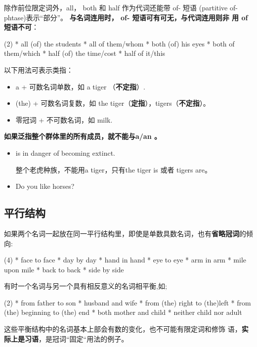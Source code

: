 除作前位限定词外，all， both 和 half 作为代词还能带 of- 短语 (partitive
of-phtase)表示“部分”。 \textbf{与名词连用时， of- 短语可有可无，与代词连用则非
  用 of短语不可}：
\begin{taskitem}(2)
  * all (of) the students
  * all of them/whom
  * both (of) his eyes
  * both of them/which
  * half (of) the time/cost
  * half of it/this
\end{taskitem}

以下用法可表示类指：
\begin{itemize}
\item a + 可数名词单数，如 a tiger （\textbf{不定指}）.
\item (the) + 可数名词复数，如 the tiger（\textbf{定指}），tigers（\textbf{不定指}）。
\item 零冠词 + 不可数名词，如 milk.
\end{itemize}

\textbf{如果泛指整个群体里的所有成员，就不能与a/an 。}
\begin{itemize}
\item {} is in danger of becoming extinct.

  整个老虎种族，不能用a tiger，只有the tiger is 或者 tigers are。

\item Do you like horses?
\end{itemize}

\subsection{平行结构}

如果两个名词一起放在同一平行结构里，即使是单数具数名词，也有\textbf{省略冠词}的倾向:
\begin{taskitem}(4)
  * face to face
  * day by day
  * hand in hand
  * eye to eye
  * arm in arm
  * mile upon mile
  * back to back
  * side by side
\end{taskitem}

有时一个名词与另一个具有相反意义的名词相平衡,如;
\begin{taskitem}(2)
* from father to son
* husband and wife
* from (the) right to (the)left
* from (the) beginning to (the) end
* both mother and child
* neither child nor adult
\end{taskitem}

这些平衡结构中的名词基本上部会有数的变化，也不可能有限定词和修饰
语，\textbf{实际上是习语}，是冠词“固定“用法的例子。



